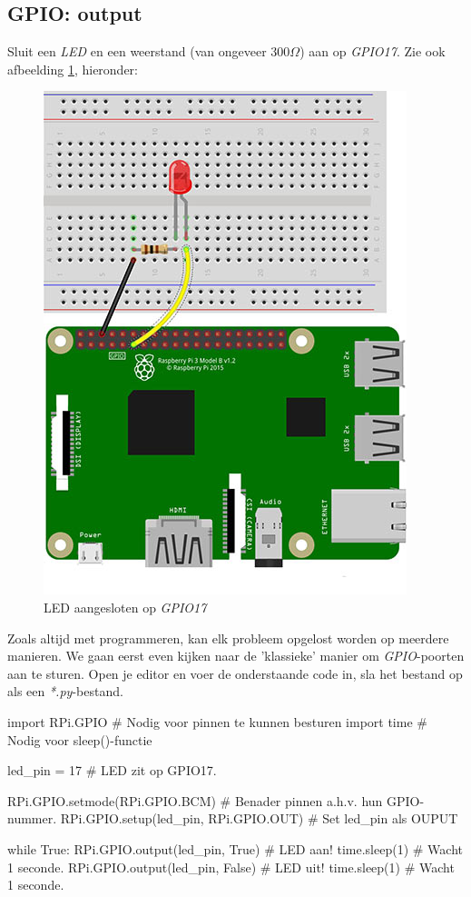 \subsection{GPIO: output}
Sluit een \textit{LED} en een weerstand (van ongeveer $300 \Omega$) aan op \textit{GPIO17}. Zie ook afbeelding \ref{fig:pi_led}, hieronder:
\begin{figure}[h!]
\centering\includegraphics[scale=0.45]{Pictures/chapter05/pi_led_01.jpg}
\caption{LED aangesloten op \textit{GPIO17}}
\label{fig:pi_led} %
\end{figure}

Zoals altijd met programmeren, kan elk probleem opgelost worden op meerdere manieren. We gaan eerst even kijken naar de 'klassieke' manier om \textit{GPIO}-poorten aan te sturen. Open je editor en voer de onderstaande code in, sla het bestand op als een \textit{*.py}-bestand.

\begin{python}
import RPi.GPIO  # Nodig voor pinnen te kunnen besturen
import time      # Nodig voor sleep()-functie

led_pin = 17     # LED zit op GPIO17.

RPi.GPIO.setmode(RPi.GPIO.BCM)         # Benader pinnen a.h.v. hun GPIO-nummer.
RPi.GPIO.setup(led_pin, RPi.GPIO.OUT)  # Set led_pin als OUPUT

while True:
    RPi.GPIO.output(led_pin, True)   # LED aan!
    time.sleep(1)                    # Wacht 1 seconde.
    RPi.GPIO.output(led_pin, False)  # LED uit!
    time.sleep(1)                    # Wacht 1 seconde.
\end{python}

